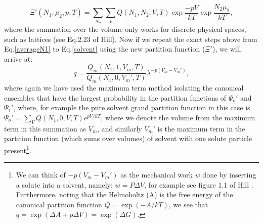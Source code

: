 \begin{equation}
\Xi'(N_1, \mu_2,p,T) = \sum_{N_2} \sum_{V} Q(N_1, N_2,V,T)\exp{\frac{-pV}{kT}} \exp{\frac{N_2 \mu_{2}}{kT}},
\end{equation}
where the summation over the volume only works for discrete physical spaces, such as lattices (see Eq.2.23 of Hill\cite{hill}).  Now if we repeat the exact steps above from Eq.\ref{averageN1} to Eq.\ref{solvent} using the new partition function ($\Xi'$), we will arrive at:
\begin{equation}\label{q2}
q = \frac{Q_m(N_1,1,V_m,T)}{Q_m(N_1,0,V_m',T)}\lambda^{-p(V_m - V_m')},
\end{equation}
where again we have used the maximum term method isolating the canonical ensembles that have the largest probability in the partition functions of $\Psi_o'$ and $\Psi_1'$, where, for example the pure solvent grand partition function in this case is $\Psi_o'=\sum_{V} Q(N_1,0,V,T)e^{pV/kT}$, where we denote the volume from the maximum term in this summation as $V_m$, and similarly $V_m$' is the maximum term in the partition function (which sums over volumes) of solvent with one solute particle present\footnote{ We can think of $-p(V_m - V_m')$ as the mechanical work $w$ done by inserting a solute into a solvent, namely: $w= P \Delta V$, for example see figure 1.1 of Hill \cite{hill}.   Furthermore, noting that the Helmoholtz (A) is the free energy of the canonical partition function $Q=\exp{(-A/kT)}$, we see that $q=\exp{( \Delta A +p \Delta V  )} = \exp{(\Delta G)}$.}.  



